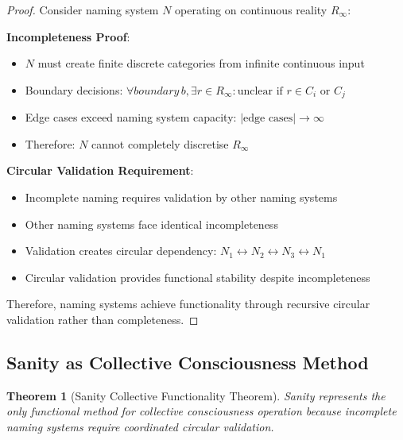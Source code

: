 \documentclass[12pt,a4paper]{article}
\newtheorem{theorem}{Theorem}[section]
\begin{document}
\begin{proof}
Consider naming system $N$ operating on continuous reality $R_{\infty}$:

\textbf{Incompleteness Proof}:
\begin{itemize}
\item $N$ must create finite discrete categories from infinite continuous input
\item Boundary decisions: $\forall boundary \, b, \exists r \in R_{\infty} : \text{unclear if } r \in C_i \text{ or } C_j$
\item Edge cases exceed naming system capacity: $|\text{edge cases}| \rightarrow \infty$
\item Therefore: $N$ cannot completely discretise $R_{\infty}$
\end{itemize}

\textbf{Circular Validation Requirement}:
\begin{itemize}
\item Incomplete naming requires validation by other naming systems
\item Other naming systems face identical incompleteness
\item Validation creates circular dependency: $N_1 \leftrightarrow N_2 \leftrightarrow N_3 \leftrightarrow N_1$
\item Circular validation provides functional stability despite incompleteness
\end{itemize}

Therefore, naming systems achieve functionality through recursive circular validation rather than completeness.
\end{proof}

\subsection{Sanity as Collective Consciousness Method}

\begin{theorem}[Sanity Collective Functionality Theorem]
Sanity represents the only functional method for collective consciousness operation because incomplete naming systems require coordinated circular validation.
\end{theorem}
\end{document}
